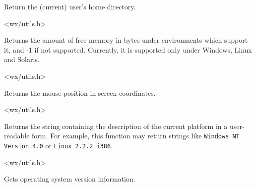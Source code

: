 
Return the (current) user's home directory.




<wx/utils.h>

\label{wxgetfreememory}


Returns the amount of free memory in bytes under environments which
support it, and -1 if not supported. Currently, it is supported only
under Windows, Linux and Solaris.


<wx/utils.h>

\label{wxgetmouseposition}


Returns the mouse position in screen coordinates.


<wx/utils.h>

\label{wxgetosdescription}


Returns the string containing the description of the current platform in a
user-readable form. For example, this function may return strings like
{\tt Windows NT Version 4.0} or {\tt Linux 2.2.2 i386}.




<wx/utils.h>

\label{wxgetosversion}


Gets operating system version information.

